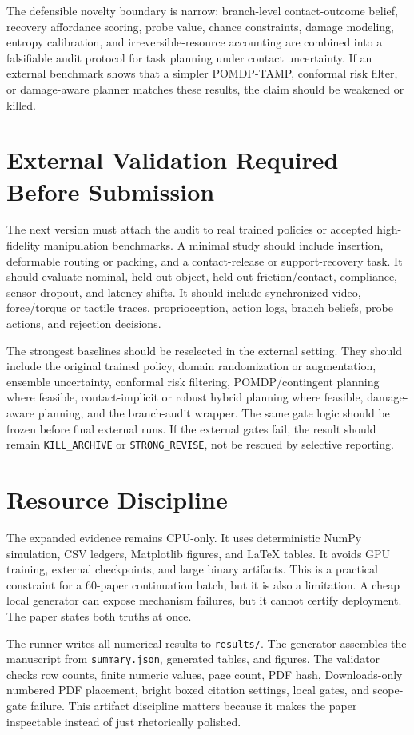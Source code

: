 \documentclass{article}
\begin{document}
The defensible novelty boundary is narrow: branch-level contact-outcome belief, recovery affordance scoring, probe value, chance constraints, damage modeling, entropy calibration, and irreversible-resource accounting are combined into a falsifiable audit protocol for task planning under contact uncertainty. If an external benchmark shows that a simpler POMDP-TAMP, conformal risk filter, or damage-aware planner matches these results, the claim should be weakened or killed.

\clearpage
\section{External Validation Required Before Submission}
The next version must attach the audit to real trained policies or accepted high-fidelity manipulation benchmarks. A minimal study should include insertion, deformable routing or packing, and a contact-release or support-recovery task. It should evaluate nominal, held-out object, held-out friction/contact, compliance, sensor dropout, and latency shifts. It should include synchronized video, force/torque or tactile traces, proprioception, action logs, branch beliefs, probe actions, and rejection decisions.

The strongest baselines should be reselected in the external setting. They should include the original trained policy, domain randomization or augmentation, ensemble uncertainty, conformal risk filtering, POMDP/contingent planning where feasible, contact-implicit or robust hybrid planning where feasible, damage-aware planning, and the branch-audit wrapper. The same gate logic should be frozen before final external runs. If the external gates fail, the result should remain \texttt{KILL\_ARCHIVE} or \texttt{STRONG\_REVISE}, not be rescued by selective reporting.

\section{Resource Discipline}
The expanded evidence remains CPU-only. It uses deterministic NumPy simulation, CSV ledgers, Matplotlib figures, and LaTeX tables. It avoids GPU training, external checkpoints, and large binary artifacts. This is a practical constraint for a 60-paper continuation batch, but it is also a limitation. A cheap local generator can expose mechanism failures, but it cannot certify deployment. The paper states both truths at once.

The runner writes all numerical results to \texttt{results/}. The generator assembles the manuscript from \texttt{summary.json}, generated tables, and figures. The validator checks row counts, finite numeric values, page count, PDF hash, Downloads-only numbered PDF placement, bright boxed citation settings, local gates, and scope-gate failure. This artifact discipline matters because it makes the paper inspectable instead of just rhetorically polished.
\end{document}
